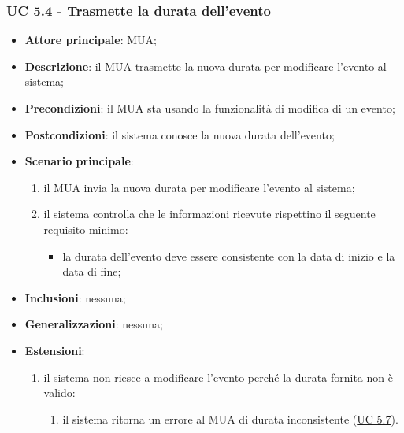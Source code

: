     \subsubsection{UC 5.4 - Trasmette la durata dell'evento} \label{sec:UC5.4}
    \begin{itemize}
        \item \textbf{Attore principale}: MUA;
        \item \textbf{Descrizione}: il MUA trasmette la nuova durata per modificare l'evento al sistema;
        \item \textbf{Precondizioni}: il MUA sta usando la funzionalità di modifica di un evento;
        \item \textbf{Postcondizioni}: il sistema conosce la nuova durata dell'evento;
        \item \textbf{Scenario principale}:
            \begin{enumerate}
                \item il MUA invia la nuova durata per modificare l'evento al sistema;
                \item il sistema controlla che le informazioni ricevute rispettino il seguente requisito minimo:
                    \begin{itemize}
                        \item la durata dell'evento deve essere consistente con la data di inizio e la data di fine;
                    \end{itemize}
            \end{enumerate}
        \item \textbf{Inclusioni}: nessuna;
        \item \textbf{Generalizzazioni}: nessuna;
        \item \textbf{Estensioni}:
            \begin{enumerate}[label=\alph*.]
                \item il sistema non riesce a modificare l'evento perché la durata fornita non è valido:
                \begin{enumerate}[label=\arabic*.]
                    \item il sistema ritorna un errore al MUA di durata inconsistente (\hyperref[sec:UC5.7]{UC 5.7}).
                \end{enumerate}
            \end{enumerate}
    \end{itemize}


